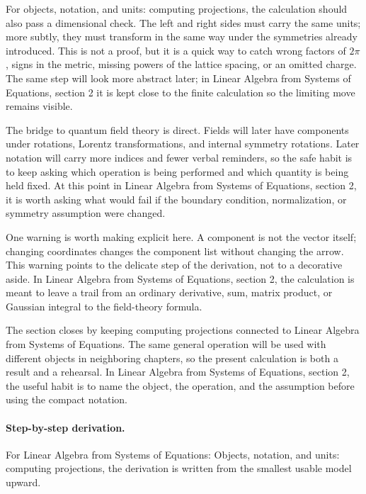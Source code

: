 For objects, notation, and units: computing projections, the calculation should also pass a dimensional check.  The left and right sides must carry the same units; more subtly, they must transform in the same way under the symmetries already introduced.  This is not a proof, but it is a quick way to catch wrong factors of \(2\pi\), signs in the metric, missing powers of the lattice spacing, or an omitted charge.  The same step will look more abstract later; in Linear Algebra from Systems of Equations, section 2 it is kept close to the finite calculation so the limiting move remains visible.

The bridge to quantum field theory is direct.  Fields will later have components under rotations, Lorentz transformations, and internal symmetry rotations.  Later notation will carry more indices and fewer verbal reminders, so the safe habit is to keep asking which operation is being performed and which quantity is being held fixed.  At this point in Linear Algebra from Systems of Equations, section 2, it is worth asking what would fail if the boundary condition, normalization, or symmetry assumption were changed.

One warning is worth making explicit here.  A component is not the vector itself; changing coordinates changes the component list without changing the arrow.  This warning points to the delicate step of the derivation, not to a decorative aside.  In Linear Algebra from Systems of Equations, section 2, the calculation is meant to leave a trail from an ordinary derivative, sum, matrix product, or Gaussian integral to the field-theory formula.

The section closes by keeping computing projections connected to Linear Algebra from Systems of Equations.  The same general operation will be used with different objects in neighboring chapters, so the present calculation is both a result and a rehearsal.  In Linear Algebra from Systems of Equations, section 2, the useful habit is to name the object, the operation, and the assumption before using the compact notation.



\paragraph{Step-by-step derivation.}

For Linear Algebra from Systems of Equations: Objects, notation, and units: computing projections, the derivation is written from the smallest usable model upward.

